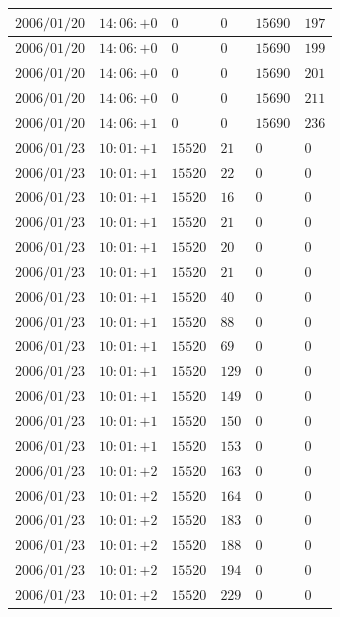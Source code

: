 \documentclass[a4j,papersize,disablejfam,slide,14pt]{jsarticle}
\begin{document}
\begin{description}
\begin{center}
\begin{longtable}{|l|l|l|l|l|l|}
					$2006/01/20$ & $14:06:+0$  & $0$ & $0$ & $15690$ & $197$ \\ \hline
					$2006/01/20$ & $14:06:+0$  & $0$ & $0$ & $15690$ & $199$ \\ \hline
					$2006/01/20$ & $14:06:+0$  & $0$ & $0$ & $15690$ & $201$ \\ \hline
					$2006/01/20$ & $14:06:+0$  & $0$ & $0$ & $15690$ & $211$ \\ \hline
					$2006/01/20$ & $14:06:+1$  & $0$ & $0$ & $15690$ & $236$ \\ \hline
					$2006/01/23$ & $10:01:+1$  & $15520$ & $21$ & $0$ & $0$ \\ \hline
					$2006/01/23$ & $10:01:+1$  & $15520$ & $22$ & $0$ & $0$ \\ \hline
					$2006/01/23$ & $10:01:+1$  & $15520$ & $16$ & $0$ & $0$ \\ \hline
					$2006/01/23$ & $10:01:+1$  & $15520$ & $21$ & $0$ & $0$ \\ \hline
					$2006/01/23$ & $10:01:+1$  & $15520$ & $20$ & $0$ & $0$ \\ \hline
					$2006/01/23$ & $10:01:+1$  & $15520$ & $21$ & $0$ & $0$ \\ \hline
					$2006/01/23$ & $10:01:+1$  & $15520$ & $40$ & $0$ & $0$ \\ \hline
					$2006/01/23$ & $10:01:+1$  & $15520$ & $88$ & $0$ & $0$ \\ \hline
					$2006/01/23$ & $10:01:+1$  & $15520$ & $69$ & $0$ & $0$ \\ \hline
					$2006/01/23$ & $10:01:+1$  & $15520$ & $129$ & $0$ & $0$ \\ \hline
					$2006/01/23$ & $10:01:+1$  & $15520$ & $149$ & $0$ & $0$ \\ \hline
					$2006/01/23$ & $10:01:+1$  & $15520$ & $150$ & $0$ & $0$ \\ \hline
					$2006/01/23$ & $10:01:+1$  & $15520$ & $153$ & $0$ & $0$ \\ \hline
					$2006/01/23$ & $10:01:+2$  & $15520$ & $163$ & $0$ & $0$ \\ \hline
					$2006/01/23$ & $10:01:+2$  & $15520$ & $164$ & $0$ & $0$ \\ \hline
					$2006/01/23$ & $10:01:+2$  & $15520$ & $183$ & $0$ & $0$ \\ \hline
					$2006/01/23$ & $10:01:+2$  & $15520$ & $188$ & $0$ & $0$ \\ \hline
					$2006/01/23$ & $10:01:+2$  & $15520$ & $194$ & $0$ & $0$ \\ \hline
					$2006/01/23$ & $10:01:+2$  & $15520$ & $229$ & $0$ & $0$ \\ \hline

\end{longtable}
\end{center}
\end{description}
\end{document}
